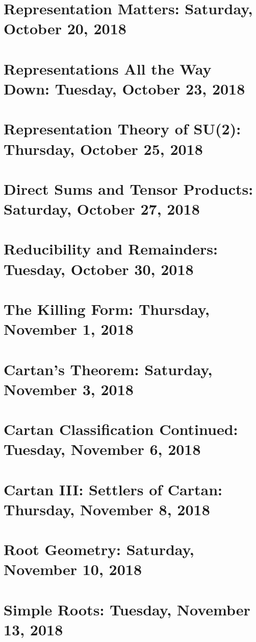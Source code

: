 \documentclass[reqno]{amsart}
\begin{document}
\section{Representation Matters: Saturday, October 20, 2018}
    
\section{Representations All the Way Down: Tuesday, October 23, 2018}
    
\section{Representation Theory of SU(2): Thursday, October 25, 2018}
    
\section{Direct Sums and Tensor Products: Saturday, October 27, 2018}
    
\section{Reducibility and Remainders: Tuesday, October 30, 2018}
    
\section{The Killing Form: Thursday, November 1, 2018}
    
\section{Cartan's Theorem: Saturday, November 3, 2018}
    
\section{Cartan Classification Continued: Tuesday, November 6, 2018}
    
\section{Cartan III: Settlers of Cartan: Thursday, November 8, 2018}
    
\section{Root Geometry: Saturday, November 10, 2018}
    
\section{Simple Roots: Tuesday, November 13, 2018}
    
\end{document}
